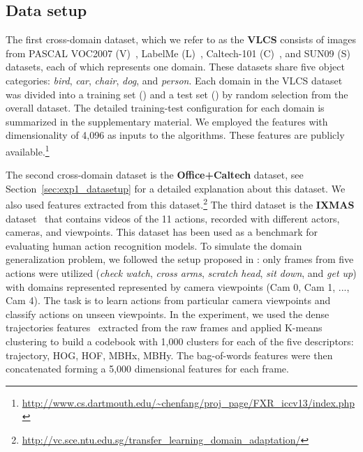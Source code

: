\documentclass[10pt,journal,compsoc]{IEEEtran}
\begin{document}
\vspace{-0.5em}
\subsection{Data setup}
\label{exp2:data_setup}
The first cross-domain dataset, which we refer to as the \textbf{VLCS}  consists of images from PASCAL VOC2007 (V)~\cite{pascal-voc-2007}, LabelMe (L)~\cite{LabelMe}, Caltech-101 (C)~\cite{Griffin2007}, and SUN09 (S)~\cite{SUN09} datasets, each of which represents one domain.
These datasets share five object categories: 
\emph{bird}, \emph{car}, \emph{chair}, \emph{dog}, and \emph{person}.
Each domain in the VLCS dataset was divided into a training set () and a test set () by random selection from the overall dataset.
The detailed training-test configuration for each domain is summarized in the supplementary material.
We employed the  features \cite{Donahue:2014aa} with dimensionality of 4,096 as inputs to the algorithms.
These features are publicly available.\footnote{\url{http://www.cs.dartmouth.edu/~chenfang/proj_page/FXR_iccv13/index.php}}

The second cross-domain dataset is the \textbf{Office+Caltech} dataset, see Section~\ref{sec:exp1_datasetup} for a detailed explanation about this dataset.
We also used  features extracted from this dataset.\footnote{\url{http://vc.sce.ntu.edu.sg/transfer_learning_domain_adaptation/}}
The third dataset is the \textbf{IXMAS} dataset~\cite{Ixmas2006} that contains videos of the 11 actions, recorded with different actors, cameras, and viewpoints.
This dataset has been used as a benchmark for evaluating human action recognition models.
To simulate the domain generalization problem, we followed the setup proposed in \cite{Xu2014}: only frames from five actions were utilized (\emph{check watch}, \emph{cross arms}, \emph{scratch head}, \emph{sit down}, and \emph{get up}) with domains represented represented by camera viewpoints (Cam 0, Cam 1, ..., Cam 4). 
The task is to learn actions from particular camera viewpoints and classify actions on unseen viewpoints.
In the experiment, we used the dense trajectories features~\cite{DTrajectory2013} extracted from the raw frames and applied K-means clustering to build a codebook with 1,000 clusters 
for each of the five descriptors: trajectory, HOG, HOF, MBHx, MBHy. 
The bag-of-words features were then concatenated forming a 5,000 dimensional features for each frame.
\end{document}
